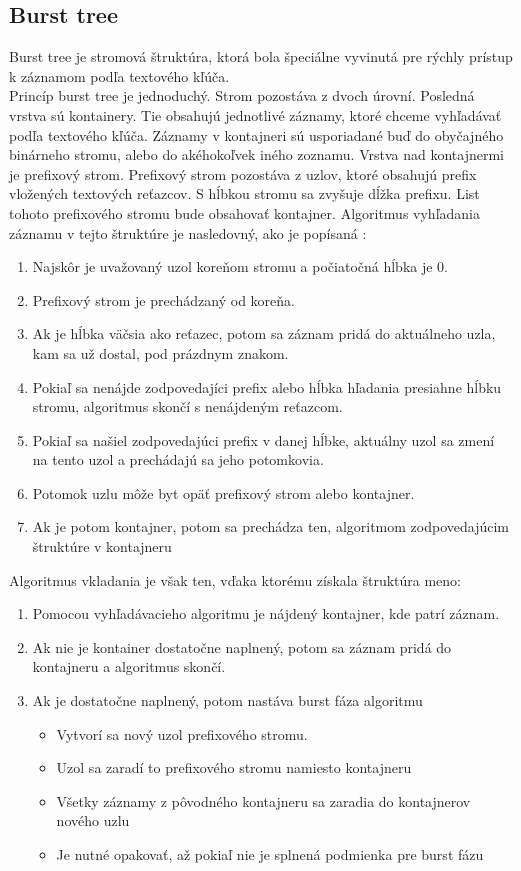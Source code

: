 \subsection {Burst tree} 
Burst tree je stromová štruktúra, ktorá bola špeciálne vyvinutá pre rýchly prístup k záznamom podľa textového kľúča.\\
Princíp burst tree je jednoduchý. Strom pozostáva z dvoch úrovní. Posledná vrstva sú kontainery. Tie obsahujú jednotlivé záznamy, ktoré chceme vyhľadávať podľa textového kľúča. Záznamy v kontajneri sú usporiadané buď do obyčajného binárneho stromu, alebo do akéhokoľvek iného zoznamu. Vrstva nad kontajnermi je prefixový strom. Prefixový strom pozostáva z uzlov, ktoré obsahujú prefix vložených textových reťazcov. S hĺbkou stromu sa zvyšuje dĺžka prefixu. List tohoto prefixového stromu bude obsahovať kontajner. Algoritmus vyhľadania záznamu v tejto štruktúre je nasledovný, ako je popísaná \cite{trees}:\\ 
\begin{enumerate}
\item Najskôr je uvažovaný uzol koreňom stromu a počiatočná hĺbka je 0.
\item Prefixový strom je prechádzaný od koreňa.
\item Ak je hĺbka väčsia ako reťazec, potom sa záznam pridá do aktuálneho uzla, kam sa už dostal, pod prázdnym znakom.
\item Pokiaľ sa nenájde zodpovedajíci prefix alebo hĺbka hľadania presiahne hĺbku stromu, algoritmus skončí s nenájdeným reťazcom.
\item Pokiaľ sa našiel zodpovedajúci prefix v danej hĺbke, aktuálny uzol sa zmení na tento uzol a prechádajú sa jeho potomkovia.
\item Potomok uzlu môže byt opäť prefixový strom alebo kontajner.
\item Ak je potom kontajner, potom sa prechádza ten, algoritmom zodpovedajúcim štruktúre v kontajneru
\end{enumerate}
Algoritmus vkladania je však ten, vďaka ktorému získala štruktúra meno:\\
\begin{enumerate}
\item Pomocou vyhľadávacieho algoritmu je nájdený kontajner, kde patrí záznam.
\item Ak nie je kontainer dostatočne naplnený, potom sa záznam pridá do kontajneru a algoritmus skončí.
\item Ak je dostatočne naplnený, potom nastáva burst fáza algoritmu
\begin{itemize}
\item Vytvorí sa nový uzol prefixového stromu.
\item Uzol sa zaradí to prefixového stromu namiesto kontajneru
\item Všetky záznamy z pôvodného kontajneru sa zaradia do kontajnerov nového uzlu
\item Je nutné opakovať, až pokiaľ nie je splnená podmienka pre burst fázu
\end{itemize}
\end{enumerate}
